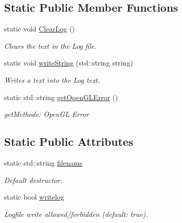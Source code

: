 \subsection*{Static Public Member Functions}
\begin{DoxyCompactItemize}
\item 
\hypertarget{class_f2_c_1_1_log_error_a37fe6ce832fff15978a84a923b081b1b}{
static void \hyperlink{class_f2_c_1_1_log_error_a37fe6ce832fff15978a84a923b081b1b}{ClearLog} ()}
\label{class_f2_c_1_1_log_error_a37fe6ce832fff15978a84a923b081b1b}

\begin{DoxyCompactList}\small\item\em Clears the text in the Log file. \item\end{DoxyCompactList}\item 
static void \hyperlink{class_f2_c_1_1_log_error_a7821ec372e85a3d2c7095c4902525908}{writeString} (std::string string)
\begin{DoxyCompactList}\small\item\em Writes a text into the Log text. \item\end{DoxyCompactList}\item 
\hypertarget{class_f2_c_1_1_log_error_ac1645d431457463e0396b46d556ab88c}{
static std::string \hyperlink{class_f2_c_1_1_log_error_ac1645d431457463e0396b46d556ab88c}{getOpenGLError} ()}
\label{class_f2_c_1_1_log_error_ac1645d431457463e0396b46d556ab88c}

\begin{DoxyCompactList}\small\item\em getMethode: OpenGL Error \item\end{DoxyCompactList}\end{DoxyCompactItemize}
\subsection*{Static Public Attributes}
\begin{DoxyCompactItemize}
\item 
static std::string \hyperlink{class_f2_c_1_1_log_error_aa5dc474b29884812c02be68e1c45c56e}{filename}
\begin{DoxyCompactList}\small\item\em Default destructor. \item\end{DoxyCompactList}\item 
\hypertarget{class_f2_c_1_1_log_error_a40a853a8ce671575d7b57433b14d2789}{
static bool \hyperlink{class_f2_c_1_1_log_error_a40a853a8ce671575d7b57433b14d2789}{writelog}}
\label{class_f2_c_1_1_log_error_a40a853a8ce671575d7b57433b14d2789}

\begin{DoxyCompactList}\small\item\em Logfile write allowed/forbidden (default: true). \item\end{DoxyCompactList}\end{DoxyCompactItemize}

